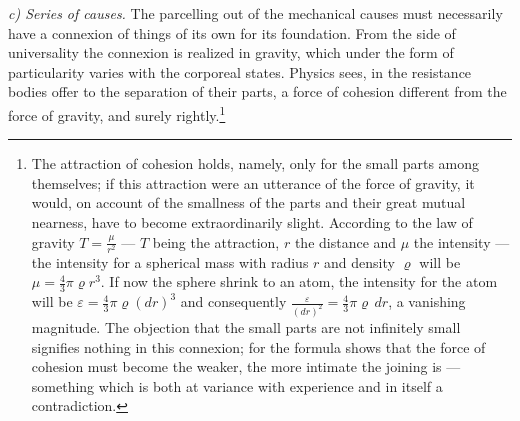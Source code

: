 \documentclass[12pt,a4paper]{book}
\newcommand{\runin}[1]{\emph{#1}\hspace{0.4em}}
\begin{document}
\runin{c) Series of causes.} The parcelling out of the mechanical causes must necessarily have a
connexion of things of its own for its foundation. From the side of universality the connexion is
realized in gravity, which under the form of particularity varies with the corporeal states. Physics
sees, in the resistance bodies offer to the separation of their parts, a force of cohesion different
from the force of gravity, and surely
rightly.\footnote{%
The attraction of cohesion holds, namely, only for the small parts among themselves; if this
attraction were an utterance of the force of gravity, it would, on account of the smallness of the
parts and their great mutual nearness, have to become extraordinarily slight. According to the law
of gravity $T = \frac{\mu}{r^{2}}$ --- $T$ being the attraction, $r$ the distance and $\mu$ the
intensity --- the intensity for a spherical mass with radius $r$ and density $\varrho$ will be
$\mu = \tfrac{4}{3}\pi\varrho r^{3}$. If now the sphere shrink to an atom, the intensity for the atom
will be $\varepsilon = \tfrac{4}{3}\pi\varrho(dr)^{3}$ and consequently
$\frac{\varepsilon}{(dr)^{2}} = \tfrac{4}{3}\pi\varrho\, dr$, a vanishing magnitude. The objection
that the small parts are not infinitely small signifies nothing in this connexion; for the formula
shows that the force of cohesion must become the weaker, the more intimate the joining is ---
something which is both at variance with experience and in itself a contradiction.}
\end{document}
